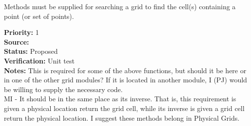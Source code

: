
Methods must be supplied for searching a grid to find the cell(s)
containing a point (or set of points).

\begin{reqlist}
{\bf Priority:} 1 \\
{\bf Source:}  \\
{\bf Status:} Proposed \\
{\bf Verification:} Unit test \\
{\bf Notes:} This is required for some of the above functions, but
             should it be here or in one of the other grid modules?
             If it is located in another module, I (PJ) would be
             willing to supply the necessary code.
             \\
             MI - It should be in the same place as its inverse.
             That is, this requirement is
             given a physical location return the grid cell,
             while its inverse is
             given a grid cell return the physical location.
             I suggest these methods belong in Physical Grids.
\end{reqlist}

